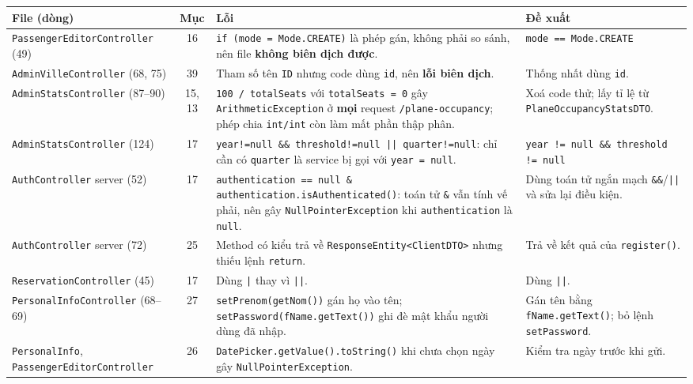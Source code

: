 \documentclass[12pt,a4paper]{article}
\begin{document}
{\footnotesize
\begin{longtable}{|L{3.1cm}|c|L{6.3cm}|L{4.0cm}|}
\hline
{}\textbf{File (dòng)} & \textbf{Mục} & \textbf{Lỗi} & \textbf{Đề xuất} \\ \hline
\endhead
\texttt{PassengerEditor\-Controller} (49) & 16 & \texttt{if (mode = Mode.CREATE)} là phép gán, không phải so sánh, nên file \textbf{không biên dịch được}. & \texttt{mode == Mode.CREATE} \\ \hline
\texttt{AdminVille\-Controller} (68, 75) & 39 & Tham số tên \texttt{ID} nhưng code dùng \texttt{id}, nên \textbf{lỗi biên dịch}. & Thống nhất dùng \texttt{id}. \\ \hline
\texttt{AdminStats\-Controller} (87--90) & 15, 13 & \texttt{100 / totalSeats} với \texttt{totalSeats = 0} gây \texttt{ArithmeticException} ở \textbf{mọi} request \texttt{/plane-occupancy}; phép chia \texttt{int/int} còn làm mất phần thập phân. & Xoá code thử; lấy tỉ lệ từ \texttt{PlaneOccupancyStatsDTO}. \\ \hline
\texttt{AdminStats\-Controller} (124) & 17 & \texttt{year!=null \&\& threshold!=null || quarter!=null}: chỉ cần có \texttt{quarter} là service bị gọi với \texttt{year = null}. & \texttt{year != null \&\& threshold != null} \\ \hline
\texttt{AuthController} server (52) & 17 & \texttt{authentication == null \&} \texttt{authentication.\allowbreak isAuthenticated()}: toán tử \texttt{\&} vẫn tính vế phải, nên gây \texttt{NullPointerException} khi \texttt{authentication} là \texttt{null}. & Dùng toán tử ngắn mạch \texttt{\&\&}/\texttt{||} và sửa lại điều kiện. \\ \hline
\texttt{AuthController} server (72) & 25 & Method có kiểu trả về \texttt{ResponseEntity<ClientDTO>} nhưng thiếu lệnh \texttt{return}. & Trả về kết quả của \texttt{register()}. \\ \hline
\texttt{Reservation\-Controller} (45) & 17 & Dùng \texttt{|} thay vì \texttt{||}. & Dùng \texttt{||}. \\ \hline
\texttt{PersonalInfo\-Controller} (68--69) & 27 & \texttt{setPrenom(getNom())} gán họ vào tên; \texttt{setPassword(fName.getText())} ghi đè mật khẩu người dùng đã nhập. & Gán tên bằng \texttt{fName.\allowbreak getText()}; bỏ lệnh \texttt{setPassword}. \\ \hline
\texttt{PersonalInfo\-}, \texttt{PassengerEditor\-Controller} & 26 & \texttt{DatePicker.getValue().toString()} khi chưa chọn ngày gây \texttt{NullPointerException}. & Kiểm tra ngày trước khi gửi. \\ \hline

\end{longtable}}
\end{document}
